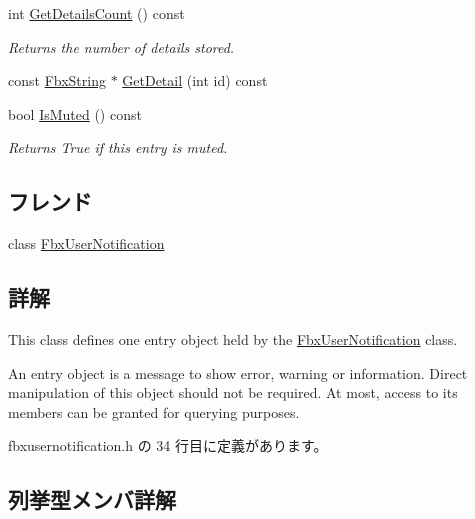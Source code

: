 \begin{DoxyCompactItemize}
int \hyperlink{class_fbx_accumulator_entry_adc709cecc41aa46b5874877c49f99b19}{Get\+Details\+Count} () const
\begin{DoxyCompactList}\small\item\em Returns the number of details stored. \end{DoxyCompactList}\item 
const \hyperlink{class_fbx_string}{Fbx\+String} $\ast$ \hyperlink{class_fbx_accumulator_entry_a1698d2ce0b959f30b912716a893cf274}{Get\+Detail} (int id) const
\item 
bool \hyperlink{class_fbx_accumulator_entry_ac7c575cce1b36df854f30ed8beb82260}{Is\+Muted} () const
\begin{DoxyCompactList}\small\item\em Returns True if this entry is muted. \end{DoxyCompactList}\end{DoxyCompactItemize}
\subsection*{フレンド}
\begin{DoxyCompactItemize}
\item 
class \hyperlink{class_fbx_accumulator_entry_a59b31f76d63ab836d795cdd0188a201a}{Fbx\+User\+Notification}
\end{DoxyCompactItemize}


\subsection{詳解}
This class defines one entry object held by the \hyperlink{class_fbx_user_notification}{Fbx\+User\+Notification} class.

An entry object is a message to show error, warning or information. Direct manipulation of this object should not be required. At most, access to its members can be granted for querying purposes. 

 fbxusernotification.\+h の 34 行目に定義があります。



\subsection{列挙型メンバ詳解}
\mbox{\label{class_fbx_accumulator_entry_af08af3ddcbf7e8fe642d7e9ecb4ad0e2}} 
